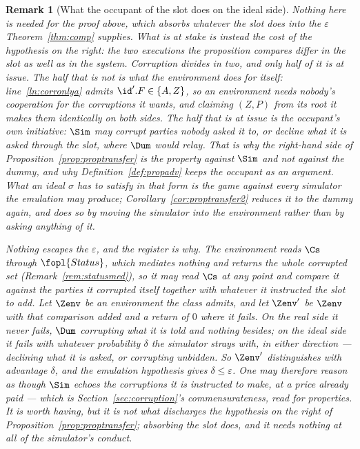 \documentclass[10pt,oneside,openany]{book}
\theoremstyle{accentdef}
\newtheorem{remark}[definition]{Remark}
\theoremstyle{accentplain}
\begin{document}
\begin{remark}[What the occupant of the slot does on the ideal side]\label{rem:propslot}
Nothing here is needed for the proof above, which absorbs whatever the slot does into the
$\varepsilon$ Theorem~\ref{thm:comp} supplies. What is at stake is instead the cost of the
\emph{hypothesis} on the right: the two executions the proposition compares differ in the slot as well
as in the system. Corruption divides in two, and only half of it is at issue. The half that is not is
what the environment does for itself: line~\ref{ln:corronlya} admits $\id'.F \in \{A,Z\}$, so an
environment needs nobody's cooperation for the corruptions it wants, and claiming $(Z,P)$ from its root
it makes them identically on both sides. The half that is at issue is the occupant's own initiative:
$\Sim$ may corrupt parties nobody asked it to, or decline what it is asked through the slot, where
$\Dum$ would relay. That is why
the right-hand side of Proposition~\ref{prop:proptransfer} is the property against $\Sim$ and not
against the dummy, and why Definition~\ref{def:propadv} keeps the occupant as an argument. What an
ideal $\sigma$ has to satisfy \emph{in that form} is the game against every simulator the emulation may
produce; Corollary~\ref{cor:proptransfer2} reduces it to the dummy again, and does so by moving the
simulator into the environment rather than by asking anything of it.

Nothing escapes the $\varepsilon$, and the register is why. The environment reads $\Cs$ through
$\fopl{Status}$, which mediates nothing and returns the whole corrupted set
(Remark~\ref{rem:statusmed}), so it may read $\Cs$ at any point and compare it against the parties it
corrupted itself together with whatever it instructed the slot to add.
Let $\Zenv$ be an environment the class admits, and let $\Zenv'$ be $\Zenv$ with that comparison added
and a return of $0$ where it fails. On the real side it never fails, $\Dum$ corrupting what it is told
and nothing besides; on the ideal side it fails with whatever probability $\delta$ the simulator strays
with, in either direction --- declining what it is asked, or corrupting unbidden. So
$\Zenv'$ distinguishes with advantage $\delta$, and the emulation hypothesis gives $\delta \leq
\varepsilon$. One may therefore reason as though $\Sim$ echoes the corruptions it is instructed to make,
at a price already paid --- which is Section~\ref{sec:corruption}'s commensurateness, read for
properties. It is worth having, but it is not what discharges the hypothesis on the right of
Proposition~\ref{prop:proptransfer}; absorbing the slot does, and it needs nothing at all of the
simulator's conduct.
\end{remark}
\end{document}
